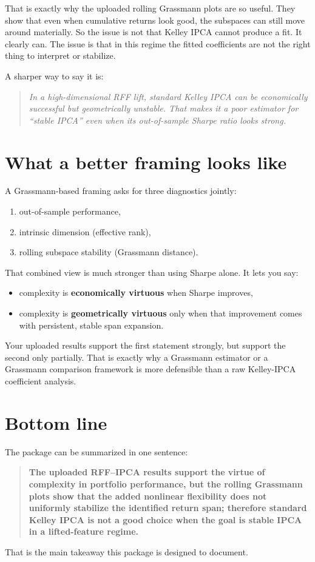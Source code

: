 \documentclass[11pt]{article}
\begin{document}
That is exactly why the uploaded rolling Grassmann plots are so useful. They show that even when cumulative returns look good,
the subspaces can still move around materially. So the issue is not that Kelley IPCA cannot produce a fit.
It clearly can. The issue is that in this regime the fitted coefficients are not the right thing to interpret or stabilize.

A sharper way to say it is:

\begin{quote}
\emph{In a high-dimensional RFF lift, standard Kelley IPCA can be economically successful but geometrically unstable.
That makes it a poor estimator for ``stable IPCA'' even when its out-of-sample Sharpe ratio looks strong.}
\end{quote}

\section{What a better framing looks like}

A Grassmann-based framing asks for three diagnostics jointly:
\begin{enumerate}
    \item out-of-sample performance,
    \item intrinsic dimension (effective rank),
    \item rolling subspace stability (Grassmann distance).
\end{enumerate}

That combined view is much stronger than using Sharpe alone. It lets you say:
\begin{itemize}
    \item complexity is \textbf{economically virtuous} when Sharpe improves,
    \item complexity is \textbf{geometrically virtuous} only when that improvement comes with persistent, stable span expansion.
\end{itemize}

Your uploaded results support the first statement strongly, but support the second only partially.
That is exactly why a Grassmann estimator or a Grassmann comparison framework is more defensible than a raw Kelley-IPCA coefficient analysis.

\section{Bottom line}

The package can be summarized in one sentence:

\begin{quote}
\textbf{The uploaded RFF--IPCA results support the virtue of complexity in portfolio performance, but the rolling Grassmann plots show that the added nonlinear flexibility does not uniformly stabilize the identified return span; therefore standard Kelley IPCA is not a good choice when the goal is stable IPCA in a lifted-feature regime.}
\end{quote}

That is the main takeaway this package is designed to document.
\end{document}
